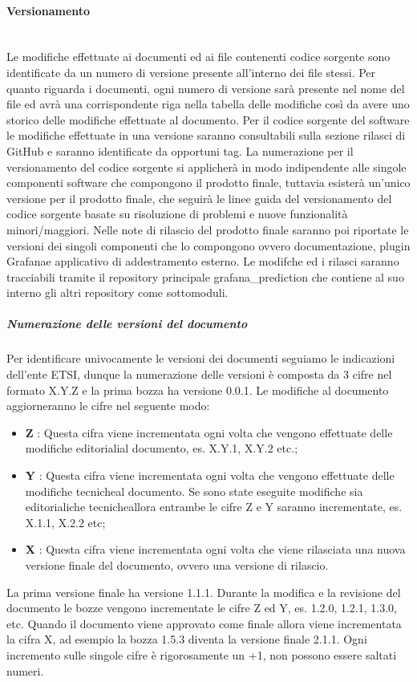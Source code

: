 		\paragraph{Versionamento}\mbox{}\\ [1mm]
		Le modifiche effettuate ai documenti ed ai file contenenti codice sorgente sono identificate da un numero di versione presente all'interno dei file stessi. Per quanto riguarda i documenti, ogni numero di versione sarà presente nel nome del file ed avrà una corrispondente riga nella tabella delle modifiche così da avere uno storico delle modifiche effettuate al documento. Per il codice sorgente del software le modifiche effettuate in una versione saranno consultabili sulla sezione rilasci di GitHub e saranno identificate da opportuni tag.
		\newline
		La numerazione per il versionamento del codice sorgente si applicherà in modo indipendente alle singole componenti software che compongono il prodotto finale, tuttavia esisterà un'unico versione per il prodotto finale, che seguirà le linee guida del versionamento del codice sorgente basate su risoluzione di problemi e nuove funzionalità minori/maggiori. Nelle note di rilascio del prodotto finale saranno poi riportate le versioni dei singoli componenti che lo compongono ovvero documentazione, plugin Grafana\glosp e applicativo di addestramento esterno. Le modifche ed i rilasci saranno tracciabili tramite il repository principale grafana\_prediction che contiene al suo interno gli altri repository come sottomoduli.
		\subparagraph*{Numerazione delle versioni del documento}
		Per identificare univocamente le versioni dei documenti seguiamo le indicazioni dell'ente ETSI, dunque la numerazione delle versioni è composta da 3 cifre nel formato X.Y.Z e la prima bozza ha versione 0.0.1. Le modifiche al documento aggiorneranno le cifre nel seguente modo:
		\begin{itemize}
			\item \textbf{Z} : Questa cifra viene incrementata ogni volta che vengono effettuate delle modifiche editoriali\glosp al documento, es. X.Y.1, X.Y.2 etc.;
			\item \textbf{Y} : Questa cifra viene incrementata ogni volta che vengono effettuate delle modifiche tecniche\glosp al documento. Se sono state eseguite modifiche sia editoriali\glosp che tecniche\glosp allora entrambe le cifre Z e Y saranno incrementate, es. X.1.1, X.2.2 etc;
			\item \textbf{X} : Questa cifra viene incrementata ogni volta che viene rilasciata una nuova versione finale del documento, ovvero una versione di rilascio.			
		\end{itemize}
		La prima versione finale ha versione 1.1.1.
		\newline
		Durante la modifica e la revisione del documento le bozze vengono incrementate le cifre Z ed Y, es. 1.2.0, 1.2.1, 1.3.0, etc.
		\newline
		Quando il documento viene approvato come finale allora viene incrementata la cifra X, ad esempio la bozza 1.5.3 diventa la versione finale 2.1.1.
		\newline
		Ogni incremento sulle singole cifre è rigorosamente un +1, non possono essere saltati numeri.
		
